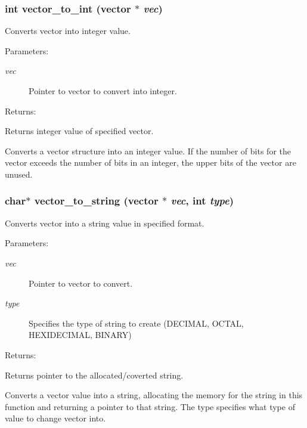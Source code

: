 \subsubsection{\setlength{\rightskip}{0pt plus 5cm}int vector\_\-to\_\-int ({\bf vector} $\ast$ {\em vec})}\label{vector_8h_a15}


Converts vector into integer value.

\begin{Desc}
\item[Parameters: ]\par
\begin{description}
\item[{\em 
vec}]Pointer to vector to convert into integer.\end{description}
\end{Desc}
\begin{Desc}
\item[Returns: ]\par
Returns integer value of specified vector.\end{Desc}
Converts a vector structure into an integer value. If the number of bits for the vector exceeds the number of bits in an integer, the upper bits of the vector are unused. 
\subsubsection{\setlength{\rightskip}{0pt plus 5cm}char$\ast$ vector\_\-to\_\-string ({\bf vector} $\ast$ {\em vec}, int {\em type})}\label{vector_8h_a17}


Converts vector into a string value in specified format.

\begin{Desc}
\item[Parameters: ]\par
\begin{description}
\item[{\em 
vec}]Pointer to vector to convert. \item[{\em 
type}]Specifies the type of string to create (DECIMAL, OCTAL, HEXIDECIMAL, BINARY)\end{description}
\end{Desc}
\begin{Desc}
\item[Returns: ]\par
Returns pointer to the allocated/coverted string.\end{Desc}
Converts a vector value into a string, allocating the memory for the string in this function and returning a pointer to that string. The type specifies what type of value to change vector into. 

